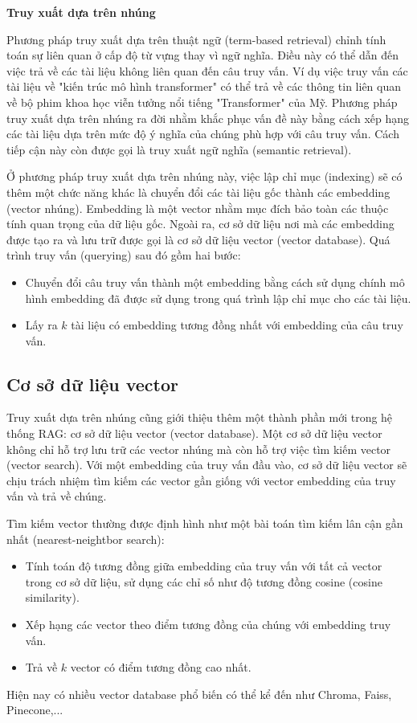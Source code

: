 \vspace{1em}
\textbf{Truy xuất dựa trên nhúng} 

Phương pháp truy xuất dựa trên thuật ngữ (term-based retrieval) chỉnh tính toán sự liên quan ở cấp độ từ vựng thay vì ngữ nghĩa. Điều này có thể dẫn đến việc trả về các tài liệu không liên quan đến câu truy vấn. Ví dụ việc truy vấn các tài liệu về "kiến trúc mô hình transformer" có thể trả về các thông tin liên quan về bộ phim khoa học viễn tưởng nổi tiếng "Transformer" của Mỹ. Phương pháp truy xuất dựa trên nhúng ra đời nhằm khắc phục vấn đề này bằng cách xếp hạng các tài liệu dựa trên mức độ ý nghĩa của chúng phù hợp với câu truy vấn. Cách tiếp cận này còn được gọi là truy xuất ngữ nghĩa (semantic retrieval).

Ở phương pháp truy xuất dựa trên nhúng này, việc lập chỉ mục (indexing) sẽ có thêm một chức năng khác là chuyển đổi các tài liệu gốc thành các embedding (vector nhúng). Embedding là một vector nhằm mục đích bảo toàn các thuộc tính quan trọng của dữ liệu gốc. Ngoài ra, cơ sở dữ liệu nơi mà các embedding được tạo ra và lưu trữ được gọi là cơ sở dữ liệu vector (vector database). Quá trình truy vấn (querying) sau đó gồm hai bước:
\begin{itemize}
    \item Chuyển đổi câu truy vấn thành một embedding bằng cách sử dụng chính mô hình embedding đã được sử dụng trong quá trình lập chỉ mục cho các tài liệu.
    \item Lấy ra $k$ tài liệu có embedding tương đồng nhất với embedding của câu truy vấn.
\end{itemize}

\vspace{1em}
\subsection{Cơ sở dữ liệu vector}
Truy xuất dựa trên nhúng cũng giới thiệu thêm một thành phần mới trong hệ thống RAG: cơ sở dữ liệu vector (vector database). Một cơ sở dữ liệu vector không chỉ hỗ trợ lưu trữ các vector nhúng mà còn hỗ trợ việc tìm kiếm vector (vector search). Với một embedding của truy vấn đầu vào, cơ sở dữ liệu vector sẽ chịu trách nhiệm tìm kiếm các vector gần giống với vector embedding của truy vấn và trả về chúng.

Tìm kiếm vector thường được định hình như một bài toán tìm kiếm lân cận gần nhất (nearest-neightbor search):
\begin{itemize}
    \item Tính toán độ tương đồng giữa embedding của truy vấn với tất cả vector trong cơ sở dữ liệu, sử dụng các chỉ số như độ tương đồng cosine (cosine similarity).
    \item Xếp hạng các vector theo điểm tương đồng của chúng với embedding truy vấn.
    \item Trả về $k$ vector có điểm tương đồng cao nhất.
\end{itemize}
Hiện nay có nhiều vector database phổ biến có thể kể đến như Chroma, Faiss, Pinecone,...

